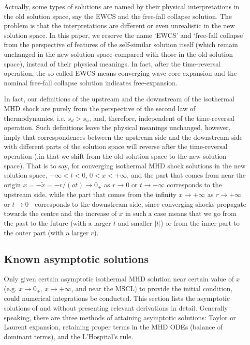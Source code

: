 \documentclass[fleqn,usenatbib]{mnras}
\begin{document}
Actually, some types of solutions are named by their physical interpretations in the old solution space, say the EWCS and the free-fall collapse solution. The problem is that the interpretations are different or even unrealistic in the new solution space. In this paper, we reserve the name `EWCS' and `free-fall collapse' from the perspective of features of the self-similar solution itself (which remain unchanged in the new solution space compared with those in the old solution space), instead of their physical meanings. In fact, after the time-reversal operation, the so-called EWCS means converging-wave-core-expansion and the nominal free-fall collapse solution indicates free-expansion.

In fact, our definitions of the upstream and the downstream of the isothermal MHD shock are purely from the perspective of the second law of thermodynamics, i.e. $s_{d}>s_{u}$, and, therefore, independent of the time-reversal operation. Such definitions leave the physical meanings unchanged, however, imply that correspondences between the upstream side and the downstream side with different parts of the solution space will reverse after the time-reversal operation (,in that we shift from the old solution space to the new solution space). That is to say, for converging isothermal MHD shock solutions in the new solution space, $-\infty<t<0$, $0<x<+\infty$, and the part that comes from near the origin $x=-\widetilde{x}=-r/(at)\rightarrow 0_{+}$ as $r\rightarrow 0$ or $t\rightarrow -\infty$ corresponds to the upstream side, while the part that comes from the infinity $x\rightarrow +\infty$ as $r\rightarrow +\infty$ or $t\rightarrow 0_{-}$ corresponds to the downstream side, since converging shocks propagate towards the centre and the increase of $x$ in such a case means that we go from the past to the future (with a larger $t$ and smaller $|t|$) or from the inner part to the outer part (with a larger $r$).


\subsection{Known asymptotic solutions}
Only given certain asymptotic isothermal MHD solution near certain value of $x$ (e.g. $x\rightarrow 0_{+}$, $x\rightarrow +\infty$, and near the MSCL) to provide the initial condition, could numerical integrations be conducted. This section lists the asymptotic solutions of \citet{yuLou2005} and \citet{yuLou2006} without presenting relevant derivations in detail. Generally speaking, there are three methods of attaining asymptotic solutions: Taylor or Laurent expansion, retaining proper terms in the MHD ODEs (balance of dominant terms), and the L'Hospital's rule.
\end{document}
